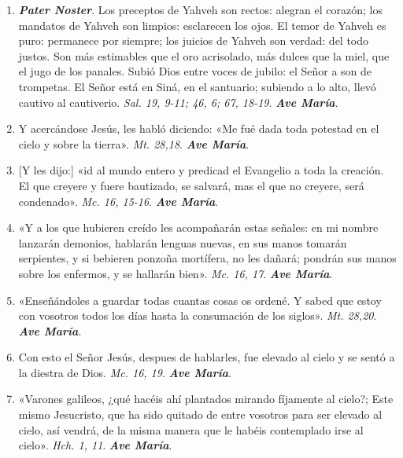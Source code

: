 \documentclass[../../devocionario.tex]{subfiles}
\begin{document}
    \begin{enumerate}
    
        \item \textbf{\emph{Pater Noster}}. Los preceptos de Yahveh son rectos: alegran el corazón; los mandatos de Yahveh son limpios: esclarecen los ojos. 
            El temor de Yahveh es puro: permanece por siempre; los juicios de Yahveh son verdad: del todo justos. Son más estimables que el oro acrisolado, más
            dulces que la miel, que el jugo de los panales. Subió Dios entre voces de jubilo: el Señor a son de trompetas. El Señor está en Siná, en el santuario; subiendo a lo alto, 
            llevó cautivo al cautiverio. \emph{Sal. 19, 9-11; 46, 6; 67, 18-19}. \textbf{\emph{Ave María}}.

        \item Y acercándose Jesús, les habló diciendo: «Me fué dada toda potestad en el cielo y sobre la tierra». \emph{Mt. 28,18}. \textbf{\emph{Ave María}}.

        \item {[Y les dijo:]} «id al mundo entero y predicad el Evangelio a toda la creación. El que creyere y fuere bautizado, 
            se salvará, mas el que no creyere, será condenado». \emph{Mc. 16, 15-16}. \textbf{\emph{Ave María}}.

        \item «Y a los que hubieren creído les acompañarán estas señales: en mi nombre lanzarán demonios, hablarán lenguas nuevas, en sus manos tomarán serpientes, 
            y si bebieren ponzoña mortífera, no les dañará; pondrán sus manos sobre los enfermos, y se hallarán bien». \emph{Mc. 16, 17}. \textbf{\emph{Ave María}}.

        \item «Enseñándoles a guardar todas cuantas cosas os ordené. Y sabed que estoy con vosotros todos 
            los días hasta la consumación de los siglos». \emph{Mt. 28,20}. \textbf{\emph{Ave María}}.

        \item Con esto el Señor Jesús, despues de hablarles, fue elevado al cielo y se sentó a la diestra de Dios. \emph{Mc. 16, 19}. \textbf{\emph{Ave María}}.

        \item «Varones galileos, ¿qué hacéis ahí plantados mirando fíjamente al cielo?; Este mismo Jesucristo, que ha sido quitado de entre vosotros 
            para ser elevado al cielo, así vendrá, de la misma manera que le habéis contemplado irse al cielo». \emph{Hch. 1, 11}. \textbf{\emph{Ave María}}.


\end{enumerate}
\end{document}
